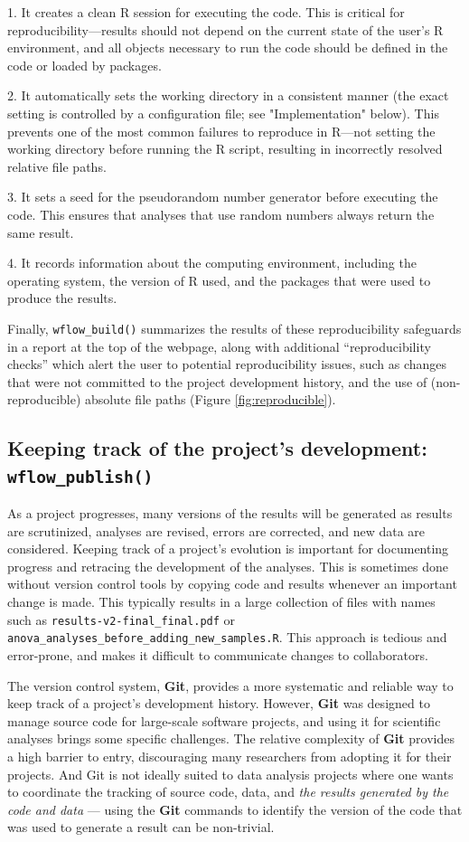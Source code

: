 \documentclass[9pt,a4paper]{extarticle}
\begin{document}
1. It creates a clean R session for executing the code. This is critical
for reproducibility—results should not depend on the current state of
the user's R environment, and all objects necessary to run the code
should be defined in the code or loaded by packages.

2. It automatically sets the working directory in a consistent manner
(the exact setting is controlled by a configuration file; see
"Implementation" below). This prevents one of the most common failures
to reproduce in R—not setting the working directory before running the R
script, resulting in incorrectly resolved relative file paths.

3. It sets a seed for the pseudorandom number generator before executing
the code. This ensures that analyses that use random numbers always
return the same result.

4. It records information about the computing environment, including the
operating system, the version of R used, and the packages that were used
to produce the results.

Finally, \texttt{wflow\_build()} summarizes the results of these reproducibility
safeguards in a report at the top of the webpage, along with additional
“reproducibility checks” which alert the user to potential
reproducibility issues, such as changes that were not committed to the
project development history, and the use of (non-reproducible) absolute
file paths (Figure \ref{fig:reproducible}).

\subsection*{Keeping track of the project's development: \texttt{wflow\_publish()}}

As a project progresses, many versions of the results will be generated
as results are scrutinized, analyses are revised, errors are corrected,
and new data are considered. Keeping track of a project's evolution is
important for documenting progress and retracing the development of the
analyses. This is sometimes done without version control tools by
copying code and results whenever an important change is made. This
typically results in a large collection of files with names such as
\texttt{results-v2-final\_final.pdf} or
\texttt{anova\_analyses\_before\_adding\_new\_samples.R}. This approach
is tedious and error-prone, and makes it difficult to communicate
changes to collaborators.

The version control system, \textbf{Git}, provides a more systematic and reliable
way to keep track of a project's development history. However, \textbf{Git} was
designed to manage source code for large-scale software projects, and
using it for scientific analyses brings some specific challenges. The
relative complexity of \textbf{Git} provides a high barrier to entry,
discouraging many researchers from adopting it for their projects. And
Git is not ideally suited to data analysis projects where one wants to
coordinate the tracking of source code, data, and \textit{the results
generated by the code and data} --- using the \textbf{Git} commands to identify
the version of the code that was used to generate a result can be
non-trivial.
\end{document}
